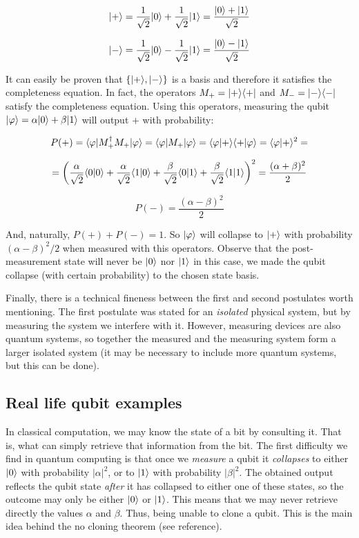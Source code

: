 $$ |+\rangle = \frac{1}{\sqrt{2}}|0\rangle + \frac{1}{\sqrt{2}}|1\rangle = \frac{|0\rangle + |1\rangle}{\sqrt{2}} $$

$$ |-\rangle = \frac{1}{\sqrt{2}}|0\rangle - \frac{1}{\sqrt{2}}|1\rangle = \frac{|0\rangle - |1\rangle}{\sqrt{2}} $$

It can easily be proven that $\{|+\rangle, |-\rangle\}$ is a basis and therefore it satisfies the completeness equation. In fact, the operators $M_+ = |+\rangle\langle +|$ and $M_- = |-\rangle\langle -|$ satisfy the completeness equation. Using this operators, measuring the qubit $|\varphi\rangle = \alpha|0\rangle + \beta|1\rangle$ will output $+$ with probability:

$$ P(+) = \langle\varphi|M_+^\dagger M_+|\varphi\rangle = \langle\varphi|M_+|\varphi\rangle = \langle\varphi|+\rangle\langle+|\varphi\rangle = \langle\varphi|+\rangle^2 = $$

$$ = \bigg ( \frac{\alpha}{\sqrt{2}}\langle0|0\rangle + \frac{\alpha}{\sqrt{2}}\langle1|0\rangle + \frac{\beta}{\sqrt{2}}\langle0|1\rangle + \frac{\beta}{\sqrt{2}}\langle1|1\rangle \bigg )^2 = \frac{(\alpha + \beta)^2}{2} $$

$$ P(-) = \frac{(\alpha - \beta)^2}{2} $$

And, naturally, $P(+) + P(-) = 1$. So $|\varphi\rangle$ will collapse to $|+\rangle$ with probability $(\alpha - \beta)^2/2$ when measured with this operators. Observe that the post-measurement state will never be $|0\rangle$ nor $|1\rangle$ in this case, we made the qubit collapse (with certain probability) to the chosen state basis.

Finally, there is a technical fineness between the first and second postulates worth mentioning. The first postulate was stated for an \emph{isolated} physical system, but by measuring the system we interfere with it. However, measuring devices are also quantum systems, so together the measured and the measuring system form a larger isolated system (it may be necessary to include more quantum systems, but this can be done).


\subsection{Real life qubit examples}


In classical computation, we may know the state of a bit by consulting it. That is, what can simply retrieve that information from the bit. The first difficulty we find in quantum computing is that once we \emph{measure} a qubit it \emph{collapses} to either $|0\rangle$ with probability $|\alpha|^2$, or to $|1\rangle$ with probability $|\beta|^2$. The obtained output reflects the qubit state \emph{after} it has collapsed to either one of these states, so the outcome may only be either $|0\rangle$ or $|1\rangle$. This means that we may never retrieve directly the values $\alpha$ and $\beta$. Thus, being unable to clone a qubit. This is the main idea behind the no cloning theorem (see reference).

